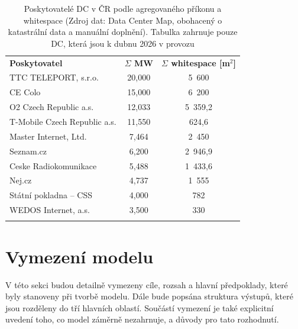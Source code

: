 \begin{table}[bt]
	\centering
	\setlength{\tabcolsep}{6pt}

	\caption[Poskytovatelé DC v ČR]{Poskytovatelé DC v ČR podle agregovaného příkonu a whitespace (Zdroj dat: Data Center Map, obohacený o katastrální data a manuální doplnění). Tabulka zahrnuje pouze DC, která jsou k dubnu 2026 v provozu}
	\label{tab:model_top_poskytovatele}

	\begin{tabular}{p{5.9cm}cc}
		\toprule
		\addlinespace
		\textbf{Poskytovatel} & \textbf{$\Sigma$ MW} & \textbf{$\Sigma$ whitespace [m$^2$]} \\

		\addlinespace
		\midrule
		\addlinespace

		TTC TELEPORT, s.r.o. & 20,000 & 5~600 \\
		CE Colo & 15,000 & 6~200 \\
		O2 Czech Republic a.s. & 12,033 & 5~359,2 \\
		T-Mobile Czech Republic a.s. & 11,550 & 624,6 \\
		Master Internet, Ltd. & 7,464 & 2~450 \\
		Seznam.cz & 6,200 & 2~946,9 \\
		Ceske Radiokomunikace & 5,488 & 1~433,6 \\
		Nej.cz & 4,737 & 1~555 \\
		Státní pokladna -- CSS & 4,000 & 782 \\
		WEDOS Internet, a.s. & 3,500 & 330 \\

		\addlinespace
		\bottomrule
	\end{tabular}

\end{table}

\section{Vymezení modelu}
\label{sec:model_vymezeni}


V této sekci budou detailně vymezeny cíle, rozsah a hlavní předpoklady, které byly stanoveny při tvorbě modelu. Dále bude popsána struktura výstupů, které jsou rozděleny do tří hlavních oblastí. Součástí vymezení je také explicitní uvedení toho, co model záměrně nezahrnuje, a důvody pro tato rozhodnutí.

